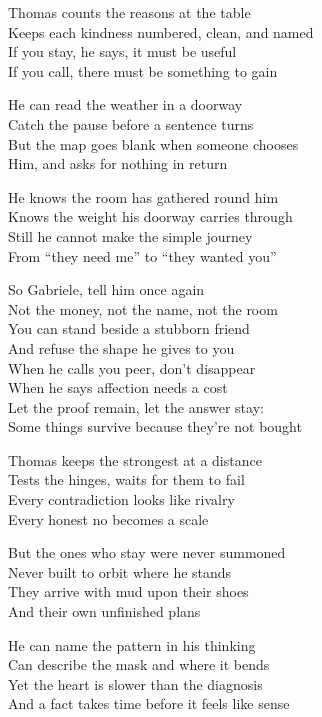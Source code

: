 \begin{lyrics}
Thomas counts the reasons at the table\\
Keeps each kindness numbered, clean, and named\\
If you stay, he says, it must be useful\\
If you call, there must be something to gain

He can read the weather in a doorway\\
Catch the pause before a sentence turns\\
But the map goes blank when someone chooses\\
Him, and asks for nothing in return

He knows the room has gathered round him\\
Knows the weight his doorway carries through\\
Still he cannot make the simple journey\\
From “they need me” to “they wanted you”

So Gabriele, tell him once again\\
Not the money, not the name, not the room\\
You can stand beside a stubborn friend\\
And refuse the shape he gives to you\\
When he calls you peer, don’t disappear\\
When he says affection needs a cost\\
Let the proof remain, let the answer stay:\\
Some things survive because they’re not bought

Thomas keeps the strongest at a distance\\
Tests the hinges, waits for them to fail\\
Every contradiction looks like rivalry\\
Every honest no becomes a scale

But the ones who stay were never summoned\\
Never built to orbit where he stands\\
They arrive with mud upon their shoes\\
And their own unfinished plans

He can name the pattern in his thinking\\
Can describe the mask and where it bends\\
Yet the heart is slower than the diagnosis\\
And a fact takes time before it feels like sense


\end{lyrics}
